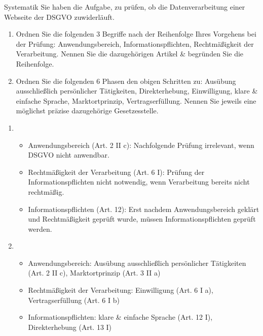 \documentclass{article}
\begin{document}
\begin{exercise}{Systematik}
  Sie haben die Aufgabe, zu prüfen, ob die Datenverarbeitung einer Webseite der DSGVO zuwiderläuft.
  \begin{enumerate}
    \item Ordnen Sie die folgenden 3 Begriffe nach der Reihenfolge Ihres Vorgehens bei der Prüfung: Anwendungsbereich, Informationspflichten, Rechtmäßigkeit der Verarbeitung. Nennen Sie die dazugehörigen Artikel \& begründen Sie die Reihenfolge.
    \item Ordnen Sie die folgenden 6 Phasen den obigen Schritten zu: Ausübung ausschließlich persönlicher Tätigkeiten, Direkterhebung, Einwilligung, klare \& einfache Sprache, Marktortprinzip, Vertragserfüllung. Nennen Sie jeweils eine möglichst präzise dazugehörige Gesetzesstelle.
  \end{enumerate}

  \begin{solution}
    \begin{enumerate}
      \item
            \begin{itemize}
              \item Anwendungsbereich (Art. 2 II c): Nachfolgende Prüfung irrelevant, wenn DSGVO nicht anwendbar.
              \item Rechtmäßigkeit der Verarbeitung (Art. 6 I): Prüfung der Informationspflichten nicht notwendig, wenn Verarbeitung bereits nicht rechtmäßig.
              \item Informationspflichten (Art. 12): Erst nachdem Anwendungsbereich geklärt und Rechtmäßigkeit geprüft wurde, müssen Informationspflichten geprüft werden.
            \end{itemize}
      \item
            \begin{itemize}
              \item Anwendungsbereich: Ausübung ausschließlich persönlicher Tätigkeiten (Art. 2 II c), Marktortprinzip (Art. 3 II a)
              \item Rechtmäßigkeit der Verarbeitung: Einwilligung (Art. 6 I a), Vertragserfüllung (Art. 6 I b)
              \item Informationspflichten: klare \& einfache Sprache (Art. 12 I), Direkterhebung (Art. 13 I)
            \end{itemize}
    \end{enumerate}
  \end{solution}
\end{exercise}
\end{document}
